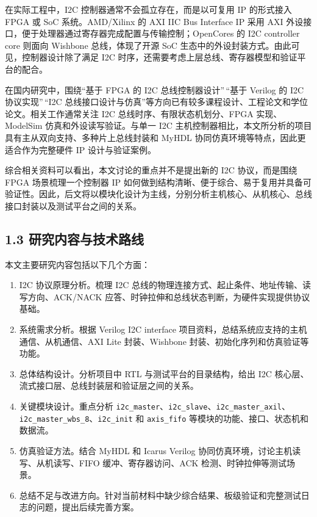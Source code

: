 在实际工程中，I2C 控制器通常不会孤立存在，而是以可复用 IP 的形式接入
FPGA 或 SoC 系统。AMD/Xilinx 的 AXI IIC Bus Interface IP 采用 AXI
外设接口，便于处理器通过寄存器完成配置与传输控制；OpenCores 的 I2C
controller core 则面向 Wishbone 总线，体现了开源 SoC
生态中的外设封装方式。由此可见，控制器设计除了满足 I2C
时序，还需要考虑上层总线、寄存器模型和验证平台的配合。

在国内研究中，围绕``基于 FPGA 的 I2C 总线控制器设计''\,``基于 Verilog 的
I2C 协议实现''\,``I2C
总线接口设计与仿真''等方向已有较多课程设计、工程论文和学位论文。相关工作通常关注
I2C 总线时序、有限状态机划分、FPGA 实现、ModelSim
仿真和外设读写验证。与单一 I2C
主机控制器相比，本文所分析的项目具有主从双向支持、多种片上总线封装和
MyHDL 协同仿真环境等特点，因此更适合作为完整硬件 IP 设计与验证案例。

综合相关资料可以看出，本文讨论的重点并不是提出新的 I2C 协议，而是围绕
FPGA 场景梳理一个控制器 IP
如何做到结构清晰、便于综合、易于复用并具备可验证性。因此，后文将以模块化设计为主线，分别分析主机核心、从机核心、总线接口封装以及测试平台之间的关系。

\subsection{1.3
研究内容与技术路线}\label{ux7814ux7a76ux5185ux5bb9ux4e0eux6280ux672fux8defux7ebf}

本文主要研究内容包括以下几个方面：

\begin{enumerate}
\def\labelenumi{\arabic{enumi}.}
\tightlist
\item
  I2C 协议原理分析。梳理 I2C
  总线的物理连接方式、起止条件、地址传输、读写方向、ACK/NACK
  应答、时钟拉伸和总线状态判断，为硬件实现提供协议基础。
\item
  系统需求分析。根据 Verilog I2C interface
  项目资料，总结系统应支持的主机通信、从机通信、AXI Lite 封装、Wishbone
  封装、初始化序列和仿真验证等功能。
\item
  总体结构设计。分析项目中 RTL 与测试平台的目录结构，给出 I2C
  核心层、流式接口层、总线封装层和验证层之间的关系。
\item
  关键模块设计。重点分析
  \texttt{i2c\_master}、\texttt{i2c\_slave}、\texttt{i2c\_master\_axil}、\texttt{i2c\_master\_wbs\_8}、\texttt{i2c\_init}
  和 \texttt{axis\_fifo} 等模块的功能、接口、状态机和数据流。
\item
  仿真验证方法。结合 MyHDL 和 Icarus Verilog
  协同仿真环境，讨论主机读写、从机读写、FIFO 缓冲、寄存器访问、ACK
  检测、时钟拉伸等测试场景。
\item
  总结不足与改进方向。针对当前材料中缺少综合结果、板级验证和完整测试日志的问题，提出后续完善方案。
\end{enumerate}

